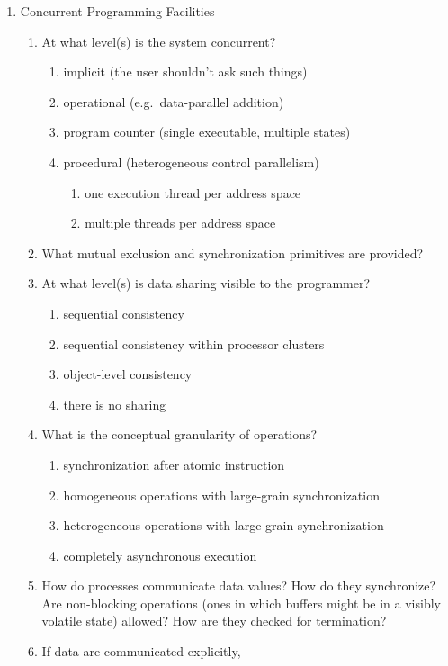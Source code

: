 \begin{small}
\begin{enumerate}
\item Concurrent Programming Facilities
  \begin{enumerate}
  \item At what level(s) is the system concurrent?
    \begin{enumerate}
    \item implicit (the user shouldn't ask such things)
    \item operational (e.g.\ data-parallel addition)
    \item program counter (single executable, multiple states)
    \item procedural (heterogeneous control parallelism)
      \begin{enumerate}
      \item one execution thread per address space
      \item multiple threads per address space
      \end{enumerate}
    \end{enumerate}
  \item What mutual exclusion and synchronization primitives are provided?
  \item At what level(s) is data sharing visible to the programmer?
    \begin{enumerate}
    \item sequential consistency
    \item sequential consistency within processor clusters
    \item object-level consistency
    \item there is no sharing
    \end{enumerate}
  \item What is the conceptual granularity of operations?
    \begin{enumerate}
    \item synchronization after atomic instruction
    \item homogeneous operations with large-grain synchronization
    \item heterogeneous operations with large-grain synchronization
    \item completely asynchronous execution
    \end{enumerate}
  \item How do processes communicate data values?
	How do they synchronize?
	Are non-blocking operations (ones in which buffers might be
	in a visibly volatile state) allowed?
	How are they checked for termination?
  \item If data are communicated explicitly,

\end{enumerate}
\end{enumerate}
\end{small}
